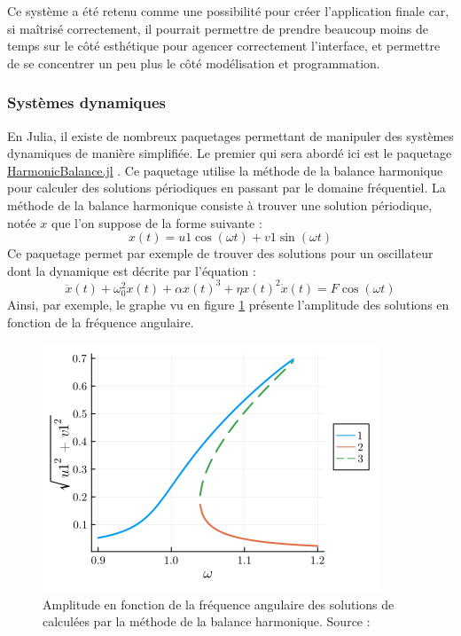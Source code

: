 \documentclass[a4paper, french, 12pt, titlepage]{article}
\begin{document}
Ce système a été retenu comme une possibilité pour créer l'application finale car, si maîtrisé correctement, il pourrait permettre de prendre beaucoup moins de temps sur le côté esthétique pour agencer correctement l'interface, et permettre de se concentrer un peu plus le côté modélisation et programmation.  

\subsubsection{Systèmes dynamiques}

En Julia, il existe de nombreux paquetages permettant de manipuler des systèmes dynamiques de manière simplifiée.
Le premier qui sera abordé ici est le paquetage \href{https://nonlinearoscillations.github.io/HarmonicBalance.jl/stable/}{HarmonicBalance.jl} \cite{kovsata2022harmonicbalance}.
Ce paquetage utilise la méthode de la balance harmonique pour calculer des solutions périodiques en passant par le domaine fréquentiel.
La méthode de la balance harmonique consiste à trouver une solution périodique, notée $x$ que l’on suppose de la forme suivante :
\begin{equation}
  x(t) = u1 \cos(\omega t) + v1 \sin(\omega t)
\end{equation}
Ce paquetage permet par exemple de trouver des solutions pour un oscillateur dont la dynamique est décrite par l'équation : 
\begin{equation}
\ddot x(t) + \omega_0^2 x(t) + \alpha x(t)^3 + \eta x(t)^2 \dot x (t) = F \cos(\omega t)
\label{eq:duffing}
\end{equation}
Ainsi, par exemple, le graphe vu en figure \ref{fig:fig8} présente l'amplitude des solutions en fonction de la fréquence angulaire.

\begin{figure}[H]
  \begin{center}
    \includegraphics[width=0.45\linewidth]{harmonicbalance.png}
    \caption{
      Amplitude en fonction de la fréquence angulaire des solutions de  calculées par la méthode de la balance harmonique.
      Source : \cite{kovsata2022harmonicbalance}
      }
    \label{fig:fig8}
  \end{center}
\end{figure}
\end{document}
